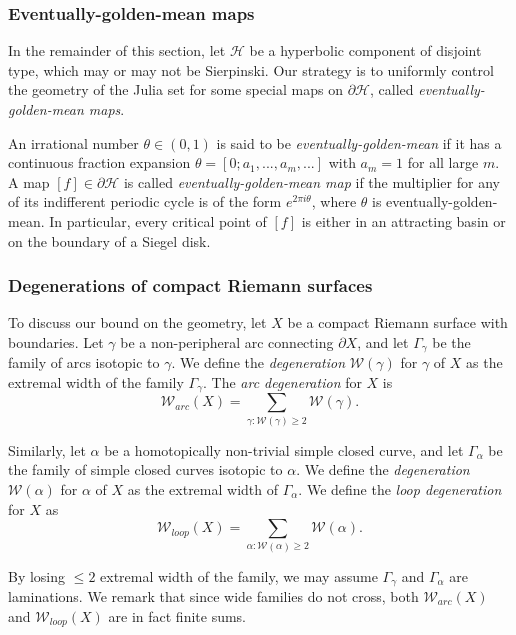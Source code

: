\documentclass[11pt, reqno]{amsart}
\numberwithin{equation}{section}
\theoremstyle{plain}
\theoremstyle{theorem}
\theoremstyle{plain}
\theoremstyle{definition}
\numberwithin{figure}{section}
\begin{document}
\subsubsection{Eventually-golden-mean maps} \label{sss:EGM}
In the remainder of this section, let $\mathcal{H}$ be a hyperbolic component of disjoint type, which may or may not be Sierpinski.
Our strategy is to uniformly control the geometry of the Julia set for some special maps on $\partial \mathcal{H}$, called {\em eventually-golden-mean maps}.


An irrational number $\theta \in (0,1)$ is said to be {\em eventually-golden-mean} if it has a continuous fraction expansion $\theta= [0; a_1,..., a_m, ...]$ with $a_m = 1$ for all large $m$.
A map $[f] \in \partial \mathcal{H}$ is called {\em eventually-golden-mean map} if the multiplier for any of its indifferent periodic cycle is of the form $e^{2\pi i \theta}$, where $\theta$ is eventually-golden-mean. In particular, every critical point of $[f]$ is either in an attracting basin or on the boundary of a Siegel disk.


\subsubsection{Degenerations of compact Riemann surfaces}
To discuss our bound on the geometry, let $X$ be a compact Riemann surface with boundaries.
Let $\gamma$ be a non-peripheral arc connecting $\partial X$, and let $\Gamma_\gamma$ be the family of arcs isotopic to $\gamma$.
We define the {\em degeneration} $\mathcal{W}(\gamma)$ for $\gamma$ of $X$ as the extremal width of the family $\Gamma_\gamma$.
The {\em arc degeneration} for $X$ is
$$
\mathcal{W}_{arc}(X) = \sum_{\gamma: \mathcal{W}(\gamma) \geq 2} \mathcal{W}(\gamma).
$$

Similarly, let $\alpha$ be a homotopically non-trivial simple closed curve, and let $\Gamma_\alpha$ be the family of simple closed curves isotopic to $\alpha$.
We define the {\em degeneration} $\mathcal{W}(\alpha)$ for $\alpha$ of $X$ as the extremal width of $\Gamma_\alpha$.
We define the {\em loop degeneration} for $X$ as
$$
\mathcal{W}_{loop}(X) = \sum_{\alpha: \mathcal{W}(\alpha) \geq 2} \mathcal{W}(\alpha).
$$

By losing $\leq 2$ extremal width of the family, we may assume $\Gamma_\gamma$ and $\Gamma_\alpha$ are laminations.
We remark that since wide families do not cross, both $\mathcal{W}_{arc}(X)$ and $\mathcal{W}_{loop}(X)$ are in fact finite sums.
\end{document}
